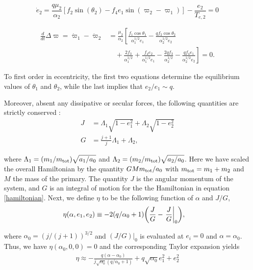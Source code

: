 \documentclass[usenatbib,twocolumn]{mnras}
\DeclarePairedDelimiter{\p}{(}{)}
\begin{document}
\begin{equation}
\label{dote2}
  \dot e_2 = \frac{q\mu_2}{\alpha_2} [f_2\sin(\theta_2) - f_4e_1 \sin(\varpi_2-\varpi_1)]- \frac{e_2}{T_{e,2}}=0
\end{equation}

\begin{align}
\label{dotdpom}
  \frac{d}{dt}\Delta\varpi = \dot\varpi_1-\dot\varpi_2
  &= \frac{\mu_2}{\alpha_2} \left[ \frac{f_1\cos\theta_1}{\alpha_1^{1/2} e_1}
     - \frac{qf_2\cos\theta_2}{\alpha_2^{1/2}e_2}\right.\nonumber \\
  &\quad+ \left.\frac{2f_3}{\alpha_1^{1/2}} + \frac{f_4e_2}{\alpha_1^{1/2} e_1}
    - \frac{2qf_3}{\alpha_2^{1/2}} - \frac{qf_4e_1}{ \alpha_2^{1/2}e_2}\right]=0.
\end{align}

\noindent To first order in eccentricity, the first two
equations determine the equilibrium values of \(\theta_1\) and
\(\theta_2\), while the last implies that \(e_2/e_1 \sim q\).

Moreover, absent any dissipative or secular forces, the following
quantities are strictly conserved \citep{xu_migration_2018}:
\begin{align}
  J &= \Lambda_1\sqrt{1-e_1^2} + \Lambda_2\sqrt{1-e_2^2}\\
  G &= \frac{j+1}{j} \Lambda_1 + \Lambda_2,
\end{align}

\noindent where \(\Lambda_1 = (m_1/m_{\rm
tot})\sqrt{a_1/a_0}\) and \(\Lambda_2=(m_2/m_{\rm tot})\sqrt{a_2/a_0}\).
Here we have scaled the overall Hamiltonian by the quantity
\(GMm_{\rm tot}/a_0\) with \(m_{\rm tot}=m_1+m_2\) and \(M\) the mass of
the primary. The quantity \(J\) is the angular
momentum of the system, and \(G\) is an integral of motion for the the
Hamiltonian in equation \eqref{hamiltonian}.
Next, we define \(\eta\) to be the following function of \(\alpha\) and \(J/G\),
\begin{align}
  \eta(\alpha, e_1, e_2) &\equiv - 2(q/\alpha_0+1)\p*{\frac{J}{G}-\left.\frac{J}{G}\right|_{0}},
\end{align}

\noindent
where \(\alpha_0 = (j/(j+1))^{3/2}\) and \(\left.(J/G)\right|_{0}\) is
evaluated at \(e_i=0\) and \(\alpha=\alpha_0\).
Thus, we have \(\eta(\alpha_0, 0, 0)=0\) and the corresponding Taylor expansion yields
\begin{align}
  \eta \approx -\frac{q(\alpha-\alpha_0)}{j\sqrt{\alpha_0}(q/\alpha_0+1)} + q\sqrt{\alpha_0}e_1^2 + e_2^2
\end{align}
\end{document}
